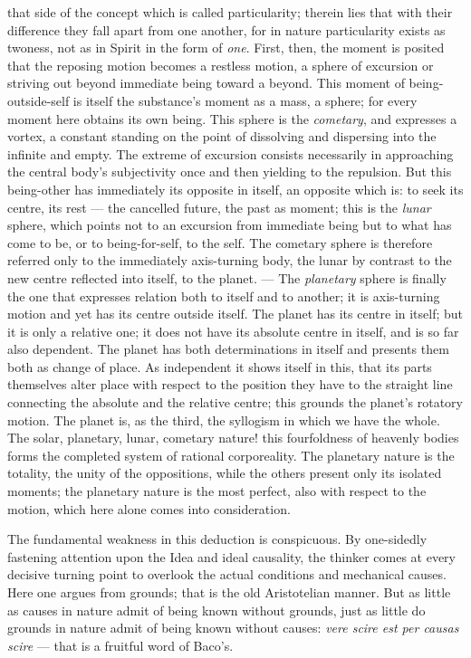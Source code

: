 \documentclass[12pt,a4paper]{book}
\begin{document}
that side of the concept which is called particularity; therein lies that with their difference they fall
apart from one another, for in nature particularity exists as twoness, not as in Spirit in the form of
\emph{one}. First, then, the moment is posited that the reposing motion becomes a restless motion, a sphere
of excursion or striving out beyond immediate being toward a beyond. This moment of being-outside-self is
itself the substance's moment as a mass, a sphere; for every moment here obtains its own being. This sphere
is the \emph{cometary}, and expresses a vortex, a constant standing on the point of dissolving and
dispersing into the infinite and empty. The extreme of excursion consists necessarily in approaching the
central body's subjectivity once and then yielding to the repulsion. But this being-other has immediately
its opposite in itself, an opposite which is: to seek its centre, its rest --- the cancelled future, the
past as moment; this is the \emph{lunar} sphere, which points not to an excursion from immediate being but
to what has come to be, or to being-for-self, to the self. The cometary sphere is therefore referred only to
the immediately axis-turning body, the lunar by contrast to the new centre reflected into itself, to the
planet. --- The \emph{planetary} sphere is finally the one that expresses relation both to itself and to
another; it is axis-turning motion and yet has its centre outside itself. The planet has its centre in
itself; but it is only a relative one; it does not have its absolute centre in itself, and is so far also
dependent. The planet has both determinations in itself and presents them both as change of place. As
independent it shows itself in this, that its parts themselves alter place with respect to the position they
have to the straight line connecting the absolute and the relative centre; this grounds the planet's
rotatory motion. The planet is, as the third, the syllogism in which we have the whole. The solar, planetary,
lunar, cometary nature! this fourfoldness of heavenly bodies forms the completed system of rational
corporeality. The planetary nature is the totality, the unity of the oppositions, while the others present
only its isolated moments; the planetary nature is the most perfect, also with respect to the motion, which
here alone comes into consideration.

The fundamental weakness in this deduction is conspicuous. By one-sidedly fastening attention upon the Idea
and ideal causality, the thinker comes at every decisive turning point to overlook the actual conditions and
mechanical causes. Here one argues from grounds; that is the old Aristotelian manner. But as little as causes
in nature admit of being known without grounds, just as little do grounds in nature admit of being known
without causes: \textit{vere scire est per causas scire} --- that is a fruitful word of Baco's.
\end{document}
